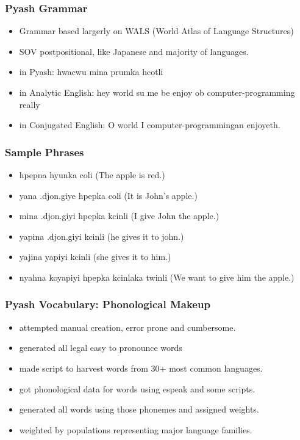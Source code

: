 \documentclass{beamer}
\begin{document}
\begin{frame}
  \frametitle{Pyash Grammar}
  \begin{itemize}
    \item Grammar based largerly on WALS (World Atlas of Language Structures)
    \item SOV postpositional, like Japanese and majority of languages.
    \item in Pyash: hwacwu mina prumka hcotli
    \item in Analytic English: hey world su me be enjoy ob computer-programming really 
    \item in Conjugated English: O world I computer-programmingan enjoyeth. 
  \end{itemize}
\end{frame}

\begin{frame}
  \frametitle{Sample Phrases}
  \begin{itemize}
    \item hpepna hyunka coli 
         (The apple is red.)
    \item yana .djon.giye hpepka coli 
         (It is John's apple.)
    \item mina .djon.giyi hpepka kcinli 
         (I give John the apple.)
    \item yapina .djon.giyi kcinli 
         (he gives it to john.)
    \item yajina yapiyi kcinli 
         (she gives it to him.)
    \item nyahna koyapiyi hpepka kcinlaka twinli 
         (We want to give him the apple.)
  \end{itemize}
\end{frame}

\begin{frame}
  \frametitle{Pyash Vocabulary: Phonological Makeup}
  \begin{itemize}
    \item attempted manual creation, error prone and cumbersome.
    \item generated all legal easy to pronounce words
    \item made script to harvest words from 30+ most common languages.
    \item got phonological data for words using espeak and some scripts.
    \item generated all words using those phonemes and assigned weights.
    \item weighted by populations representing major language families.
  \end{itemize}
\end{frame}
\end{document}
